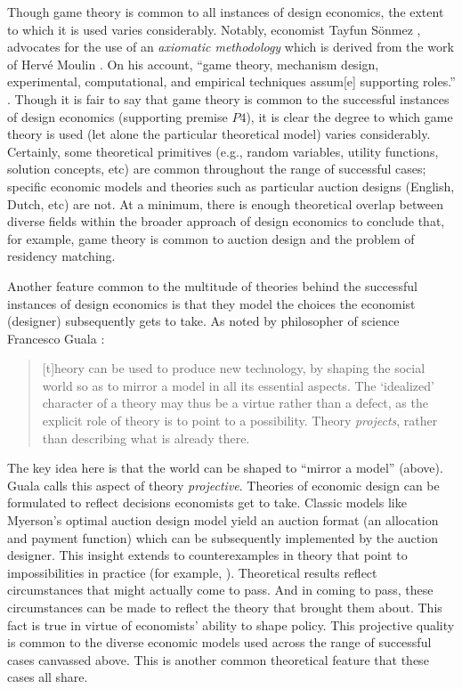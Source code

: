 Though game theory is common to all instances of design economics, the extent to which it is used varies considerably. Notably, economist Tayfun Sönmez \autocite*{sönmez2023minimalist}, advocates for the use of an \textit{axiomatic methodology} which is derived from the work of Hervé Moulin \autocite*{moulin1988}. On his account, ``game theory, mechanism design, experimental, computational, and empirical techniques assum[e] supporting roles.'' \autocite[13]{sönmez2023minimalist}. Though it is fair to say that game theory is common to the successful instances of design economics (supporting premise $P4$), it is clear the degree to which game theory is used (let alone the particular theoretical model) varies considerably. Certainly, some theoretical primitives (e.g., random variables, utility functions, solution concepts, etc) are common throughout the range of successful cases; specific economic models and theories such as particular auction designs (English, Dutch, etc) are not. At a minimum, there is enough theoretical overlap between diverse fields within the broader approach of design economics to conclude that, for example, game theory is common to auction design and the problem of residency matching. 

Another feature common to the multitude of theories behind the successful instances of design economics is that they model the choices the economist (designer) subsequently gets to take. As noted by philosopher of science Francesco Guala \autocite*[456, emphasis original]{guala2001}:
\begin{quote}
    [t]heory can be used to produce new technology, by shaping the social world so as to mirror a model in all its essential aspects. The `idealized' character of a theory may thus be a virtue rather than a defect, as the explicit role of theory is to point to a possibility. Theory \textit{projects}, rather than describing what is already there.
\end{quote}
\noindent The key idea here is that the world can be shaped to ``mirror a model'' (above). Guala calls this aspect of theory \textit{projective}. Theories of economic design can be formulated to reflect decisions economists get to take. Classic models like Myerson's \autocite*{myerson1981optimal} optimal auction design model yield an auction format (an allocation and payment function) which can be subsequently implemented by the auction designer. This insight extends to counterexamples in theory that point to impossibilities in practice (for example, \cite{myerson1983}). Theoretical results reflect circumstances that might actually come to pass. And in coming to pass, these circumstances can be made to reflect the theory that brought them about. This fact is true in virtue of economists' ability to shape policy. This projective quality is common to the diverse economic models used across the range of successful cases canvassed above. This is another common theoretical feature that these cases all share.


